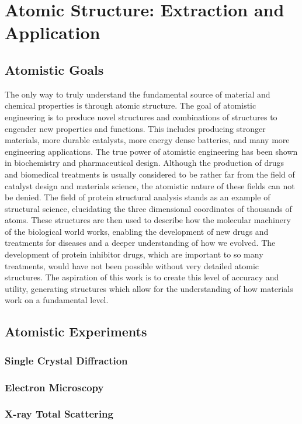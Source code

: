 \chapter{Atomic Structure: Extraction and Application}
\section{Atomistic Goals}
The only way to truly understand the fundamental source of material and chemical properties is through atomic structure.
The goal of atomistic engineering is to produce novel structures and combinations of structures to engender new properties and functions.
This includes producing stronger materials, more durable catalysts, more energy dense batteries, and many more engineering applications.
The true power of atomistic engineering has been shown in biochemistry and pharmaceutical design.
Although the production of drugs and biomedical treatments is usually considered to be rather far from the field of catalyst design and materials science, the atomistic nature of these fields can not be denied.
The field of protein structural analysis stands as an example of structural science, elucidating the three dimensional coordinates of thousands of atoms.
These structures are then used to describe how the molecular machinery of the biological world works, enabling the development of new drugs and treatments for diseases and a deeper understanding of how we evolved.
The development of protein inhibitor drugs, which are important to so many treatments, would have not been possible without very detailed atomic structures.
The aspiration of this work is to create this level of accuracy and utility, generating structures which allow for the understanding of how materials work on a fundamental level.
\section{Atomistic Experiments}
\subsection{Single Crystal Diffraction}
\subsection{Electron Microscopy}
\subsection{X-ray Total Scattering}

